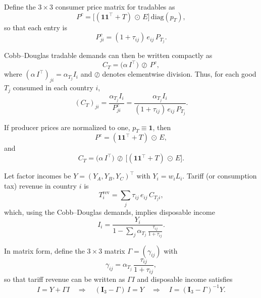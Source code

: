 \documentclass[11pt]{article}
\begin{document}
Define the $3\times 3$ consumer price matrix for tradables as
\begin{equation}
P^{c}
=
\bigl[(\mathbf{1}\mathbf{1}^\top + T)\,\odot\,E\bigr]\,
\mathrm{diag}(p_T),
\end{equation}
so that each entry is
\begin{equation}
P^{c}_{ji} 
= (1+\tau_{ij})\, e_{ij}\, P_{T_j}.
\end{equation}

Cobb--Douglas tradable demands can then be written compactly as
\begin{equation}
C_T
=
\bigl(\alpha\, I^\top\bigr)
\,\oslash\,
P^{c},
\end{equation}
where $(\alpha\, I^\top)_{ji} = \alpha_{T_j} I_i$ and $\oslash$ denotes elementwise division. 
Thus, for each good $T_j$ consumed in each country $i$,
\begin{equation}
(C_T)_{ji}
=
\frac{\alpha_{T_j} I_i}{P^{c}_{ji}}
=
\frac{\alpha_{T_j} I_i}{(1+\tau_{ij})\, e_{ij}\, P_{T_j}}.
\end{equation}

If producer prices are normalized to one, $p_T \equiv \mathbf{1}$, then
\begin{equation}
P^{c}
=
(\mathbf{1}\mathbf{1}^\top + T)\,\odot\,E,
\end{equation}
and
\begin{equation}
C_T
=
\bigl(\alpha\, I^\top\bigr)\,\oslash\,
\bigl[(\mathbf{1}\mathbf{1}^\top + T)\,\odot\,E\bigr].
\end{equation}

Let factor incomes be $Y = (Y_A,Y_B,Y_C)^\top$ with $Y_i = w_i L_i$.
Tariff (or consumption tax) revenue in country $i$ is
\begin{equation}
T_i^{\mathrm{rev}}
=
\sum_{j} \tau_{ij}\, e_{ij}\, C_{T_j i},
\end{equation}
which, using the Cobb--Douglas demands, implies disposable income
\begin{equation}
I_i
=
\frac{Y_i}{
1 - \displaystyle\sum_{j} \alpha_{T_j}\, \frac{\tau_{ij}}{1+\tau_{ij}}
}.
\end{equation}

In matrix form, define the $3\times 3$ matrix $\Gamma = (\gamma_{ij})$ with
\begin{equation}
\gamma_{ij}
=
\alpha_{T_j}\, \frac{\tau_{ij}}{1+\tau_{ij}},
\end{equation}
so that tariff revenue can be written as $\Gamma I$ and disposable income satisfies
\begin{equation}
I = Y + \Gamma I
\quad\Rightarrow\quad
(\mathbf{I}_3 - \Gamma)\, I = Y
\quad\Rightarrow\quad
I = (\mathbf{I}_3 - \Gamma)^{-1} Y.
\end{equation}
\end{document}
